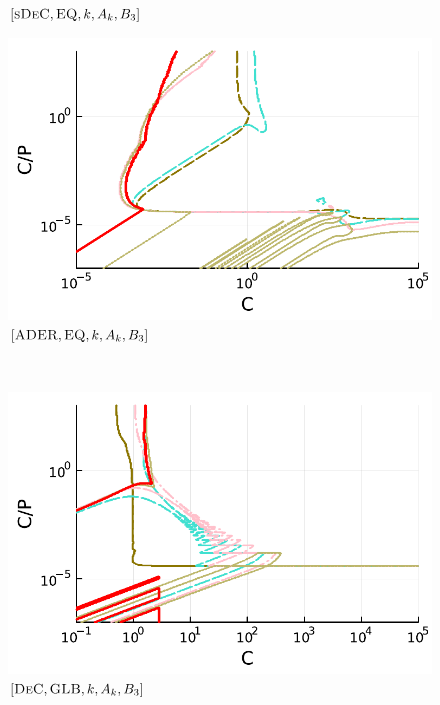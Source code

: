 \begin{figure}
\begin{minipage}[t]{0.325\textwidth}
	\small$[\textsc{sDeC}, \textsc{EQ},k,A_k,B_3]$\par
	\end{minipage}
	\begin{minipage}[t]{0.325\textwidth}
		\centering
		\includegraphics[width=\textwidth]{pdf/pdepics/disp/IMEXADER_equispaced_disp_advTMM_2-6_newE.pdf}
		\small$[\textsc{ADER}, \textsc{EQ},k,A_k,B_3]$\par
	\end{minipage}\\[2mm]
	\begin{minipage}[t]{0.325\textwidth}
		\centering
		\includegraphics[width=\textwidth]{pdf/pdepics/disp/IMEXDeC_gaussLobatto_disp_advTMM_2-6_newE.pdf}
		\small$[\textsc{DeC}, \textsc{GLB},k,A_k,B_3]$\par
	\end{minipage}
	\begin{minipage}[t]{0.325\textwidth}
		\centering

\end{minipage}
\end{figure}
